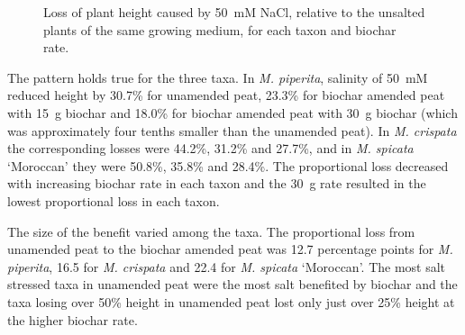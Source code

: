 \begin{figure}[htbp]
  \centering
  \caption[Loss of plant height at 50~mM NaCl by growing medium]{Loss of plant height caused by 50~mM NaCl, relative to the unsalted plants of the same growing medium, for each taxon and biochar rate.}
  \label{fig:decline}
\end{figure}

The pattern holds true for the three taxa. In \textit{M. piperita}, salinity of 50~mM reduced height by 30.7\% for unamended peat, 23.3\% for biochar amended peat with 15~g biochar and 18.0\% for biochar amended peat with 30~g biochar (which was approximately four tenths smaller than the unamended peat). In \textit{M. crispata} the corresponding losses were 44.2\%, 31.2\% and 27.7\%, and in \textit{M. spicata} `Moroccan' they were 50.8\%, 35.8\% and 28.4\%. The proportional loss decreased with increasing biochar rate in each taxon and the 30~g rate resulted in the lowest proportional loss in each taxon.

The size of the benefit varied among the taxa. The proportional loss from unamended peat to the biochar amended peat was 12.7 percentage points for \textit{M. piperita}, 16.5 for \textit{M. crispata} and 22.4 for \textit{M. spicata} `Moroccan'. The most salt stressed taxa in unamended peat were the most salt benefited by biochar and the taxa losing over 50\% height in unamended peat lost only just over 25\% height at the higher biochar rate.

